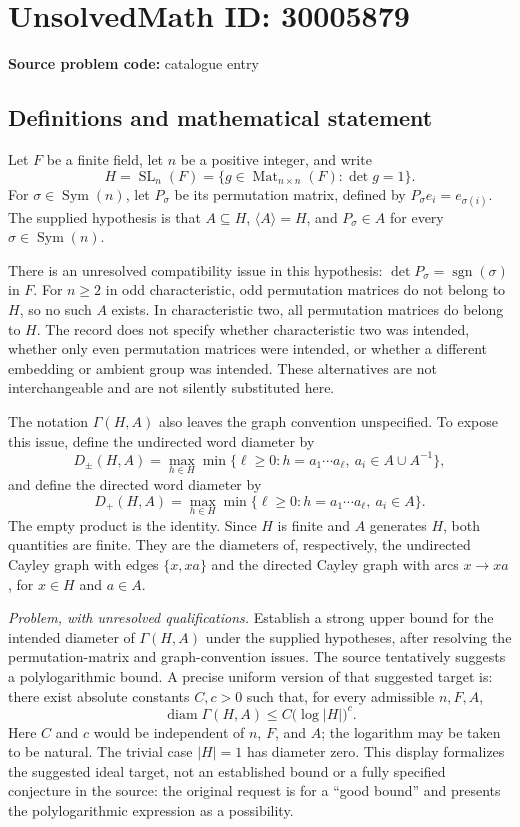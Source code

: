 \documentclass[11pt]{article}
\begin{document}
\section*{UnsolvedMath ID: 30005879}
\textbf{Source problem code:} catalogue entry
\subsection{Definitions and mathematical statement}
Let \(F\) be a finite field, let \(n\) be a positive integer, and write
\[
H=\operatorname{SL}_n(F)=\{g\in\operatorname{Mat}_{n\times n}(F):\det g=1\}.
\]
For \(\sigma\in\operatorname{Sym}(n)\), let \(P_\sigma\) be its permutation matrix, defined by \(P_\sigma e_i=e_{\sigma(i)}\). The supplied hypothesis is that \(A\subseteq H\), \(\langle A\rangle=H\), and \(P_\sigma\in A\) for every \(\sigma\in\operatorname{Sym}(n)\).

There is an unresolved compatibility issue in this hypothesis: \(\det P_\sigma=\operatorname{sgn}(\sigma)\) in \(F\). For \(n\geq2\) in odd characteristic, odd permutation matrices do not belong to \(H\), so no such \(A\) exists. In characteristic two, all permutation matrices do belong to \(H\). The record does not specify whether characteristic two was intended, whether only even permutation matrices were intended, or whether a different embedding or ambient group was intended. These alternatives are not interchangeable and are not silently substituted here.

The notation \(\Gamma(H,A)\) also leaves the graph convention unspecified. To expose this issue, define the undirected word diameter by
\[
D_{\pm}(H,A)=\max_{h\in H}\min\{\ell\geq0:h=a_1\cdots a_\ell,\ a_i\in A\cup A^{-1}\},
\]
and define the directed word diameter by
\[
D_+(H,A)=\max_{h\in H}\min\{\ell\geq0:h=a_1\cdots a_\ell,\ a_i\in A\}.
\]
The empty product is the identity. Since \(H\) is finite and \(A\) generates \(H\), both quantities are finite. They are the diameters of, respectively, the undirected Cayley graph with edges \(\{x,xa\}\) and the directed Cayley graph with arcs \(x\to xa\), for \(x\in H\) and \(a\in A\).

\emph{Problem, with unresolved qualifications.} Establish a strong upper bound for the intended diameter of \(\Gamma(H,A)\) under the supplied hypotheses, after resolving the permutation-matrix and graph-convention issues. The source tentatively suggests a polylogarithmic bound. A precise uniform version of that suggested target is: there exist absolute constants \(C,c>0\) such that, for every admissible \(n,F,A\),
\[
\operatorname{diam}\Gamma(H,A)\leq C\bigl(\log|H|\bigr)^c.
\]
Here \(C\) and \(c\) would be independent of \(n\), \(F\), and \(A\); the logarithm may be taken to be natural. The trivial case \(|H|=1\) has diameter zero. This display formalizes the suggested ideal target, not an established bound or a fully specified conjecture in the source: the original request is for a ``good bound'' and presents the polylogarithmic expression as a possibility.
\end{document}
